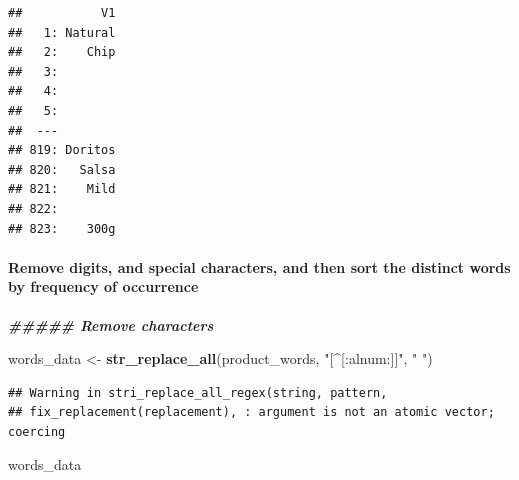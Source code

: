 \documentclass[
]{article}
\newenvironment{Shaded}{\begin{snugshade}}{\end{snugshade}}
\newcommand{\DocumentationTok}[1]{\textcolor[rgb]{0.56,0.35,0.01}{\textbf{\textit{#1}}}}
\newcommand{\FunctionTok}[1]{\textcolor[rgb]{0.13,0.29,0.53}{\textbf{#1}}}
\newcommand{\NormalTok}[1]{#1}
\newcommand{\OtherTok}[1]{\textcolor[rgb]{0.56,0.35,0.01}{#1}}
\newcommand{\StringTok}[1]{\textcolor[rgb]{0.31,0.60,0.02}{#1}}
\begin{document}
\begin{verbatim}
##           V1
##   1: Natural
##   2:    Chip
##   3:        
##   4:        
##   5:        
##  ---        
## 819: Doritos
## 820:   Salsa
## 821:    Mild
## 822:        
## 823:    300g
\end{verbatim}

\hypertarget{remove-digits-and-special-characters-and-then-sort-the-distinct-words-by-frequency-of-occurrence}{%
\paragraph{Remove digits, and special characters, and then sort the
distinct words by frequency of
occurrence}\label{remove-digits-and-special-characters-and-then-sort-the-distinct-words-by-frequency-of-occurrence}}

\begin{Shaded}
\begin{Highlighting}[]
\DocumentationTok{\#\#\#\#\# Remove characters}

\NormalTok{words\_data }\OtherTok{\textless{}{-}} \FunctionTok{str\_replace\_all}\NormalTok{(product\_words, }\StringTok{"[\^{}[:alnum:]]"}\NormalTok{, }\StringTok{" "}\NormalTok{)}
\end{Highlighting}
\end{Shaded}

\begin{verbatim}
## Warning in stri_replace_all_regex(string, pattern,
## fix_replacement(replacement), : argument is not an atomic vector; coercing
\end{verbatim}

\begin{Shaded}
\begin{Highlighting}[]
\NormalTok{words\_data}
\end{Highlighting}
\end{Shaded}
\end{document}
